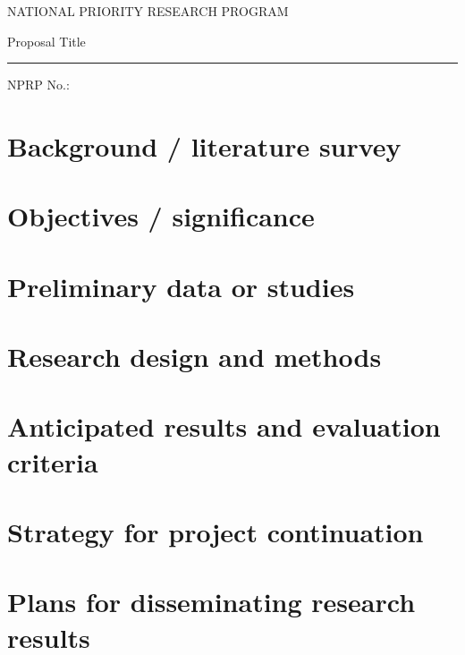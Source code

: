 \documentclass[12pt,letterpaper]{article}
\begin{document}
\begin{titlepage}
\begin{center}
\fontsize{11}{15}
\selectfont
NATIONAL PRIORITY RESEARCH PROGRAM

\vspace{4.5cm}

\fontsize{40}{48}
\selectfont
Proposal Title
\vspace{0.4cm}
{\color{blue2}\hrule}
\vspace{0.4cm}
\fontsize{22}{26}
\selectfont
NPRP No.:

\end{center}
\end{titlepage}

\rfoot{}
\renewcommand\contentsname{Table of Content}
\tableofcontents

\newpage
\setcounter{page}{1}

\section{Background / literature survey}

\section{Objectives / significance}

\section{Preliminary data or studies}

\section{Research design and methods}

\section{Anticipated results and evaluation criteria}

\section{Strategy for project continuation}

\section{Plans for disseminating research results}

\newpage
\setcounter{page}{1}

\nocite{Nobody06}


\end{document}
